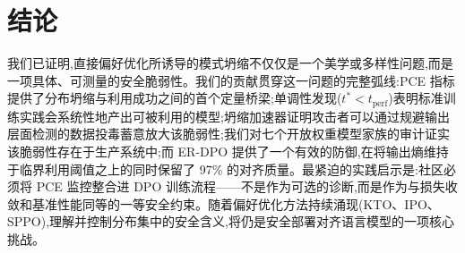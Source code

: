 \section{结论}
\label{sec:conclusion}

我们已证明,直接偏好优化所诱导的模式坍缩不仅仅是一个美学或多样性问题,而是一项具体、可测量的安全脆弱性。我们的贡献贯穿这一问题的完整弧线:PCE 指标提供了分布坍缩与利用成功之间的首个定量桥梁;单调性发现($t^* < t_{\text{perf}}$)表明标准训练实践会系统性地产出可被利用的模型;坍缩加速器证明攻击者可以通过规避输出层面检测的数据投毒蓄意放大该脆弱性;我们对七个开放权重模型家族的审计证实该脆弱性存在于生产系统中;而 ER-DPO 提供了一个有效的防御,在将输出熵维持于临界利用阈值之上的同时保留了 97\% 的对齐质量。最紧迫的实践启示是:社区必须将 PCE 监控整合进 DPO 训练流程——不是作为可选的诊断,而是作为与损失收敛和基准性能同等的一等安全约束。随着偏好优化方法持续涌现(KTO、IPO、SPPO),理解并控制分布集中的安全含义,将仍是安全部署对齐语言模型的一项核心挑战。

